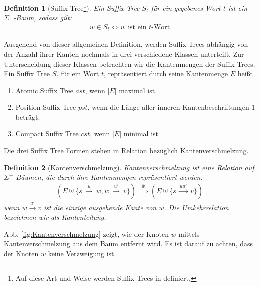 \documentclass[12pt]{report}
\newtheorem{definition}{Definition}
\newcommand{\abs}[1]{\left|#1\right|}
\begin{document}
\begin{definition}[Suffix Tree\footnote{Auf diese Art und Weise werden Suffix Trees in \cite{Giegerich1995} definiert.}]
Ein Suffix Tree $S_t$ für ein gegebenes Wort $t$ ist ein $\Sigma^+$-Baum, sodass gilt:
\begin{gather*}
    w \in S_t \Longleftrightarrow w \text{ ist ein }t\text{-Wort}
\end{gather*}
\label{def:SuffixTree}
\end{definition}

Ausgehend von dieser allgemeinen Definition, werden Suffix Trees abhängig von der Anzahl ihrer Kanten nochmals in drei verschiedene Klassen unterteilt. Zur Unterscheidung dieser Klassen betrachten wir die Kantenmengen der Suffix Trees. Ein Suffix Tree $S_t$ für ein Wort $t$, repräsentiert durch seine Kantenmenge $E$ heißt
\begin{enumerate}
    \item Atomic Suffix Tree $ast$, wenn $\abs{E}$ maximal ist.
    \item Position Suffix Tree $pst$, wenn die Länge aller inneren Kantenbeschriftungen $1$ beträgt.
    \item Compact Suffix Tree $cst$, wenn $\abs{E}$ minimal ist
\end{enumerate}
Die drei Suffix Tree Formen stehen in Relation bezüglich Kantenverschmelzung.

\begin{definition}[Kantenverschmelzung]
Kantenverschmelzung ist eine Relation auf $\Sigma^+$-Bäumen, die durch ihre Kantenmengen repräsentiert werden.
\begin{gather*}
    \left(E \uplus \{\overline{s}\:\xrightarrow{u}\:\overline{w},\overline{w}\:\xrightarrow{u'}\:\overline{v}\}\right) \overset{\overline{w}}{\implies} \left(E \uplus \{\overline{s}\:\xrightarrow{uu'}\:\overline{v}\}\right)
\end{gather*}
wenn $\overline{w} \xrightarrow{u'} \overline{v}$ ist die einzige ausgehende Kante von $\overline{w}$. Die Umkehrrelation bezeichnen wir als Kantenteilung.
\end{definition}
Abb. \ref{fig:Kantenverschmelzung} zeigt, wie der Knoten $w$ mittels Kantenverschmelzung aus dem Baum entfernt wird. Es ist darauf zu achten, dass der Knoten $w$ keine Verzweigung ist.
\end{document}
